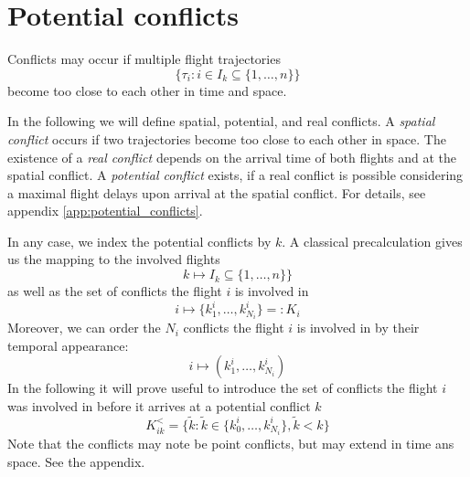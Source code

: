 \documentclass{article}
\begin{document}
\section{Potential conflicts}
Conflicts may occur if multiple flight trajectories
\begin{equation*}
    \{\tau_i : i \in I_k \subseteq \{1, \dots, n\}\}
\end{equation*}
become too close to each other in time and space.

In the following we will define spatial, potential, and real conflicts.
A \textit{spatial conflict} occurs if two trajectories become too close 
to each other in space.
The existence of a \textit{real conflict} depends on the arrival time of both flights and at the spatial conflict.
A \textit{potential conflict} exists, if a real conflict is possible considering a maximal flight delays upon arrival at the spatial conflict.
For details, see appendix \ref{app:potential_conflicts}.

In any case, we index the potential conflicts by $k$.
A classical precalculation gives us the mapping to the involved flights
\begin{equation*}
    k \mapsto I_k \subseteq \{1, \dots, n\}\}
\end{equation*}
as well as the set of conflicts the flight $i$ is involved in
\begin{equation}
    i \mapsto \{k^i_1, \dots, k^i_{N_i}\} =: K_i
\end{equation}
Moreover, we can order the $N_i$ conflicts the flight $i$ is involved in by their temporal appearance:
\begin{equation*}
    i \mapsto (k^i_1, \dots, k^i_{N_i})
\end{equation*}
In the following it will prove useful to introduce the set of conflicts the flight $i$ was involved in before it arrives at a potential conflict $k$
\begin{equation*}
    K^<_{ik} = \{\tilde k : \tilde k \in\{k^i_0, \dots, k^i_{N_i}\}, \tilde k < k\}
\end{equation*}
Note that the conflicts may note be point conflicts, but may extend in time ans space. See the appendix.
\end{document}
